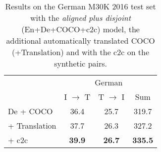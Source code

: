\begin{table}[t]
    \centering
    \renewcommand{\arraystretch}{1.0}
    \begin{tabular}{lccc}
        \toprule
         & \multicolumn{3}{c}{German}\\
         & I $\rightarrow$ T & T $\rightarrow$ I & Sum\\
         \midrule
         De + COCO & 36.4 & 25.7 & 319.7\\
         \: \: + Translation & 37.7 & 26.3 & 327.2\\
         \: \: \: + c2c      & {\bf 39.9} & {\bf 26.7} & {\bf 335.5}\\
         \bottomrule
    \end{tabular}
    \caption{Results on the German
    M30K 2016 test set with the \emph{aligned plus disjoint} 
    (En+De+COCO+c2c) model, the additional automatically translated COCO (+Translation) and with the c2c on the synthetic pairs.
    }
    \label{tab:german_translation_disjoint}
\end{table}

\begin{comment}
\begin{table*}[ht]
    \centering
    \renewcommand{\arraystretch}{1.0}
    \begin{tabular}{lccccccc}
        \toprule
         & \multicolumn{3}{c}{English} & \multicolumn{3}{c}{German}\\
         \cmidrule(lr){2-4} \cmidrule(lr){5-7}
         & I $\rightarrow$ T & T $\rightarrow$ I & Sum  & I $\rightarrow$ T & T $\rightarrow$ I & Sum & Sum(Sum)\\
         \midrule
         En+De+COCO+c2c & 46.5 & 34.8 & 378.87 & 40.6 & 28.8 & 344.59 & 723.45 \\
         \: + Translation & \textbf{47.5} & \textbf{36.2} & \textbf{384.50} & \textbf{43.5} & \textbf{30.5} & \textbf{357.90} & \textbf{742.40}\\
         \bottomrule
    \end{tabular}
    \caption{Performance measured on the English and German
    M30K 2016 test set for the \emph{aligned plus disjoint} (En+De+COCO+c2c) model and with the additional automatically translated (+Translation).}
    \label{tab:translation_alignedplusdisjoint}
\end{table*}
\end{comment}

